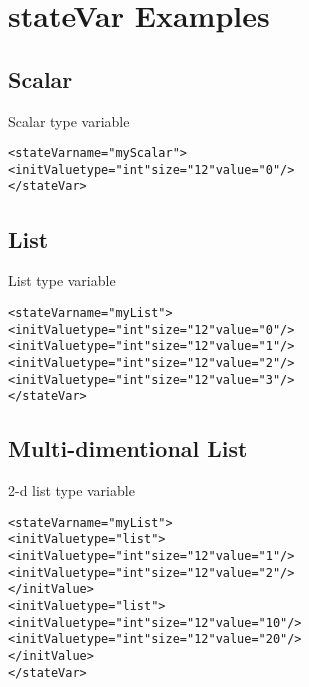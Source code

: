 \chapter{stateVar Examples}
\section{Scalar}
Scalar type variable
\begin{alltt}
<stateVar name="myScalar">
  <initValue type="int" size="12" value="0"/>
</stateVar>
\end{alltt}

\section{List}
List type variable
\begin{alltt}
<stateVar name="myList">
  <initValue type="int" size="12" value="0"/>
  <initValue type="int" size="12" value="1"/>
  <initValue type="int" size="12" value="2"/>
  <initValue type="int" size="12" value="3"/>
</stateVar>
\end{alltt}

\section{Multi-dimentional List}
2-d list type variable
\begin{alltt}
<stateVar name="myList">
  <initValue type="list">
    <initValue type="int" size="12" value="1"/>
    <initValue type="int" size="12" value="2"/>
  </initValue>
  <initValue type="list">
    <initValue type="int" size="12" value="10"/>
    <initValue type="int" size="12" value="20"/>
  </initValue>
</stateVar>
\end{alltt}


